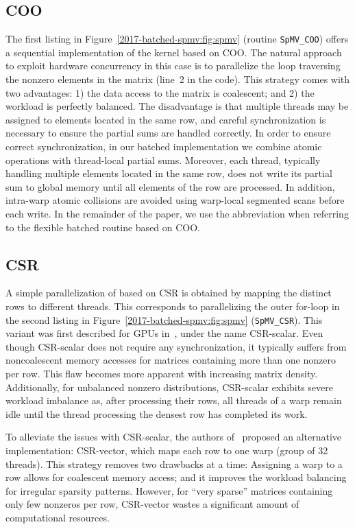 \subsection{COO}
The first listing 
in Figure~\ref{2017-batched-spmv:fig:spmv} (routine {\tt SpMV\_COO}) offers a sequential implementation 
of the \spmv kernel based on COO.
The natural approach to exploit hardware concurrency in this case
is to parallelize the loop traversing the nonzero elements in the matrix
(line~2 in the code). 
This strategy comes with two advantages: 1) the data access to the matrix
is coalescent; and
2) the workload
is perfectly balanced.
The disadvantage
is that multiple threads
may be assigned to elements located in the same row, and careful synchronization 
is necessary to ensure the partial sums are handled correctly. 
In order
to ensure correct synchronization,
in our batched implementation we combine atomic operations 
with thread-local partial sums. Moreover, each thread, typically handling multiple elements
located in the same row, does not write its partial sum to global memory until
all elements of the row are processed.
In addition, intra-warp atomic collisions are avoided
using warp-local segmented scans before each write.
In the remainder of the paper, we use the abbreviation \coo when referring to the
flexible batched \spmv routine based on COO.

\subsection{CSR}
A simple parallelization of \spmv based on CSR 
is obtained by mapping the distinct rows to different threads.
This corresponds to parallelizing the outer for-loop in the second listing
in Figure~\ref{2017-batched-spmv:fig:spmv} ({\tt SpMV\_CSR}).
This variant was first described for GPUs in~\cite{garlandspmv},
under the name CSR-scalar.
Even though CSR-scalar does not require any synchronization,
it typically suffers from noncoalescent memory accesses
for matrices containing more than one nonzero per row.
This flaw becomes more apparent with increasing matrix density.
Additionally, for unbalanced nonzero distributions,
CSR-scalar exhibits severe workload imbalance as,
after processing their rows, 
all threads of a warp remain idle until the thread processing 
the densest row has completed its work.

To alleviate the issues with CSR-scalar, the authors of~\cite{garlandspmv}
proposed an alternative implementation: CSR-vector, which
maps each row to one warp (group of 32 threads).
This strategy removes two drawbacks at a time:
Assigning a warp to a row allows for coalescent memory access;
and it improves the workload balancing for irregular sparsity patterns.
However, for ``very sparse'' matrices containing only few nonzeros per row,
CSR-vector wastes a significant amount of computational resources.

